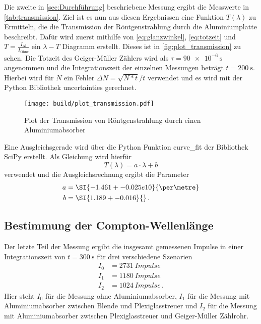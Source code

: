 Die zweite in \autoref{sec:Durchführung} beschriebene Messung ergibt die Messwerte in \autoref{tab:transmission}.
Ziel ist es nun aus diesen Ergebnissen eine Funktion $T(\lambda)$ zu Ermitteln, die die Transmission der Röntgenstrahlung durch die Aluminiumplatte beschreibt.
Dafür wird zuerst mithilfe von \autoref{eq:glanzwinkel}, \autoref{eq:totzeit} und $T=\frac{I_\text{Al}}{I_\text{Ohne}}$ ein $\lambda-T$ Diagramm erstellt.
Dieses ist in \autoref{fig:plot_transmission} zu sehen.
Die Totzeit des Geiger-Müller Zählers wird als $\tau = \SI{90e-6}{\second}$ angenommen und die Integrationszeit der einzelnen Messungen beträgt $t=\SI{200}{\second}$.
Hierbei wird für $N$ ein Fehler $\Delta N = \sqrt{N*t}/t$ verwendet und es wird mit der Python Bibliothek uncertainties gerechnet.\cite{uncertainties}

\begin{figure}
    \centering
    \texttt{[image: build/plot\_transmission.pdf]}
    \caption{Plot der Transmission von Röntgenstrahlung durch einen Aluminiumabsorber}
    \label{fig:plot_transmission}
\end{figure}

Eine Ausgleichsgerade wird über die Python Funktion curve\_fit der Bibliothek SciPy erstellt. \cite{scipy}
Als Gleichung wird hierfür
\begin{equation}
    T(\lambda) = a \cdot \lambda + b
\end{equation}
verwendet und die Ausgleichsrechnung ergibt die Parameter
\begin{align*}
    a &= \SI{-1.461+-0.025e10}{\per\metre} \\
    b &= \SI{1.189+-0.016}{} \,.
\end{align*}

\subsection{Bestimmung der Compton-Wellenlänge}
\label{ssec:compton-wellenlänge}

Der letzte Teil der Messung ergibt die insgesamt gemessenen Impulse in einer Integrationszeit von $t=\SI{300}{\second}$ für drei verschiedene Szenarien
\begin{align*}
    I_0 &= \SI{2731}{Impulse} \\
    I_1 &= \SI{1180}{Impulse} \\
    I_2 &= \SI{1024}{Impulse} \,.
\end{align*}
Hier steht $I_0$ für die Messung ohne Aluminiumabsorber, $I_1$ für die Messung mit Aluminiumabsorber zwischen Blende und Plexiglasstreuer und $I_2$ für die Messung mit Aluminiumabsorber zwischen Plexiglasstreuer und Geiger-Müller Zählrohr.

